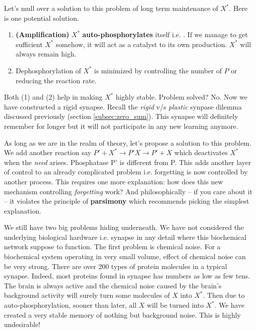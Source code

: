 \documentclass[]{resonance}
\begin{document}
Let's mull over a solution to this problem of long term maintenance of $X^*$.
Here is one potential solution.

\begin{enumerate}
    \item \textbf{(Amplification)} $X^*$ \textbf{auto-phosphorylates} itself i.e. . If we manage to get sufficient $X^*$ somehow, it
        will act as a catalyst to its own production. $X^*$ will always remain
        high.
    \item Dephosphorylation of $X^*$ is minimized by controlling the number of
        $P$ or reducing the reaction rate.
\end{enumerate} 

Both (1) and (2) help in making $X^*$ highly stable. Problem solved? No.  Now
we have constructed a rigid synapse. Recall the \textit{rigid} v/s
\textit{plastic} synpase dilemma discussed previously (section
\ref{subsec:zero_sum}). This synapse will definitely remember for longer
but it will not participate in any new learning anymore.

As long as we are in the realm of theory, let's propose a solution to this
problem. We add another reaction say $P'+X^*\rightarrow P'X \rightarrow P'+X$
which deactivates $X^*$ when the \textit{need} arises. Phosphatase P' is
different from P. This adds another layer of control to an already complicated
problem i.e.  forgetting is now controlled by another process. This requires one
more explanation: how does this new mechanism controlling \textit{forgetting}
work?  And philosophically -- if you care about it -- it violates the principle
of \textbf{parsimony} which recommends picking the simplest explanation.

We still have two big problems hiding underneath. We have not considered the
underlying biological hardware i.e. synapse in any detail where this biochemical
network suppose to function. The first problem is chemical noise. For a
biochemical system operating in very small volume, effect of chemical noise can
be very strong.  There are over 200 types of protein molecules in
a typical synapse. Indeed, most proteins found in synapse has numbers as low as
few tens. The brain is always active and the chemical noise caused by the
brain's background activity will surely turn some molecules of $X$ into $X^*$.
Then due to auto-phosphorylation, sooner than later, all $X$ will be turned into
$X^*$. We have created a very stable memory of nothing but background noise.
This is highly undesirable!
\end{document}
